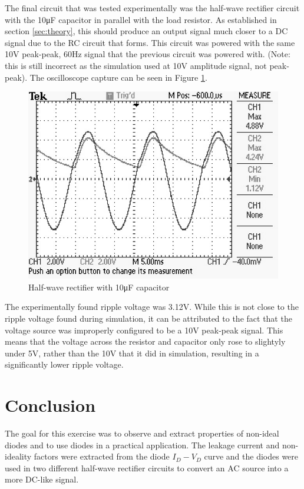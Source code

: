 \documentclass[11pt]{article}
\begin{document}
	\hfill \break

	The final circuit that was tested experimentally was the half-wave 
	rectifier circuit with the 10\si{\micro\farad} capacitor in parallel
	with the load resistor. As established in section \ref{sec:theory},
	this should produce an output signal much closer to a DC signal due to
	the RC circuit that forms. This circuit was powered with the same
	10\si{\volt} peak-peak, 60\si{\hertz} signal that the previous circuit
	was powered with. (Note: this is still incorrect as the simulation used
	at 10\si{\volt} amplitude signal, not peak-peak). The oscilloscope capture
	can be seen in Figure \ref{fig:half-wave_rectifier_cap_graph_exp}.

	\begin{figure}[H]
		\centering
		\includegraphics{half_wave_rectifier_cap_graph_exp.JPG}
		\caption{Half-wave rectifier with 10\si{\micro\farad} capacitor}
		\label{fig:half-wave_rectifier_cap_graph_exp}
	\end{figure}

	The experimentally found ripple voltage was 3.12\si{\volt}. While this
	is not close to the ripple voltage found during simulation, it can
	be attributed to the fact that the voltage source was improperly
	configured to be a 10\si{\volt} peak-peak signal. This means that the 
	voltage across the resistor and capacitor only rose to slightyly under 
	5\si{\volt}, rather than the 10\si{\volt} that it did in simulation,
	resulting in a significantly lower ripple voltage.\\

	\section{Conclusion}
	The goal for this exercise was to observe and extract properties
	of non-ideal diodes and to use diodes in a practical application. 
	The leakage current and non-ideality factors were extracted from 
	the diode \(I_D - V_D\) curve and the diodes were used in two 
	different half-wave rectifier circuits to convert an AC source
	into a more DC-like signal.\\
	
\end{document}
